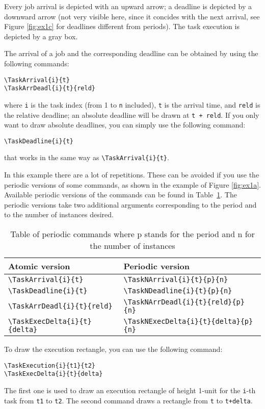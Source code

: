 \documentclass{article}
\begin{document}
Every job arrival is depicted with an upward arrow; a deadline is
depicted by a downward arrow (not very visible here, since it concides
with the next arrival, see Figure \ref{fig:ex1c} for deadlines
different from periods). The task execution is depicted by a gray box.

The arrival of a job and the corresponding deadline can be obtained by
using the following commands:
\begin{verbatim}
\TaskArrival{i}{t}
\TaskArrDeadl{i}{t}{reld}
\end{verbatim}
\noindent where \texttt{i} is the task index (from 1 to \texttt{n}
included), \texttt{t} is the arrival time, and \texttt{reld} is the
relative deadline; an absolute deadline will be drawn at \texttt{t +
  reld}. If you only want to draw absolute deadlines, you can simply use the following command:
\begin{verbatim}
\TaskDeadline{i}{t}
\end{verbatim}
\noindent that works in the same way as \verb+\TaskArrival{i}{t}+.


In this example there are a lot of repetitions. These can be avoided
if you use the periodic versions of some commands, as shown in the example of
Figure \ref{fig:ex1a}. Available periodic versions of the commands can be found in Table~\ref{tab:periodic_versions}. The periodic versions take two additional arguments corresponding to the period and to the number of instances desired.

\begin{table}[!htbp]
\begin{tabular}{|l|l|}
 \hline
  Atomic version & Periodic version  \\
 \hline
 \verb+\TaskArrival{i}{t}+ & \verb+\TaskNArrival{i}{t}{p}{n}+ \\
 \verb+\TaskDeadline{i}{t}+ & \verb+\TaskNDeadline{i}{t}{p}{n}+ \\
 \verb+\TaskArrDeadl{i}{t}{reld}+ & \verb+\TaskNArrDeadl{i}{t}{reld}{p}{n}+  \\
 \verb+\TaskExecDelta{i}{t}{delta}+ & \verb+\TaskNExecDelta{i}{t}{delta}{p}{n}+\\
  \hline
\end{tabular}
\caption{Table of periodic commands where p stands for the period and n for the number of instances}
\label{tab:periodic_versions}
\end{table}



To draw the execution rectangle, you can use the following command:
\begin{verbatim}
\TaskExecution{i}{t1}{t2}
\TaskExecDelta{i}{t}{delta}
\end{verbatim}
The first one is used to draw an execution rectangle of height 1-unit
for the \texttt{i}-th task from \texttt{t1} to \texttt{t2}. The second
command draws a rectangle from \texttt{t} to \texttt{t+delta}.
\end{document}
